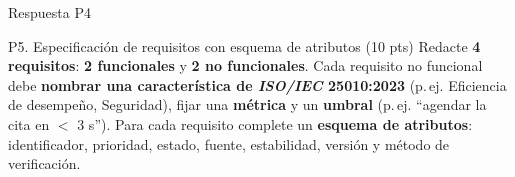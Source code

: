 \documentclass[11pt,a4paper,oneside]{article}
\begin{document}
\begin{respuesta}{Respuesta P4}
\begin{center}
{}
\end{center}
\end{respuesta}


\begin{tarea}{P5. Especificaci\'on de requisitos con esquema de atributos \hfill (10 pts)}
Redacte \textbf{4 requisitos}: \textbf{2 funcionales} y \textbf{2 no funcionales}. Cada requisito no funcional debe \textbf{nombrar una caracter\'istica de \textit{ISO/IEC} 25010:2023} (p.\,ej. Eficiencia de desempe\~no, Seguridad), fijar una \textbf{m\'etrica} y un \textbf{umbral} (p.\,ej. ``agendar la cita en $<$ 3 s''). Para cada requisito complete un \textbf{esquema de atributos}: identificador, prioridad, estado, fuente, estabilidad, versi\'on y m\'etodo de verificaci\'on.
\end{tarea}
\end{document}

